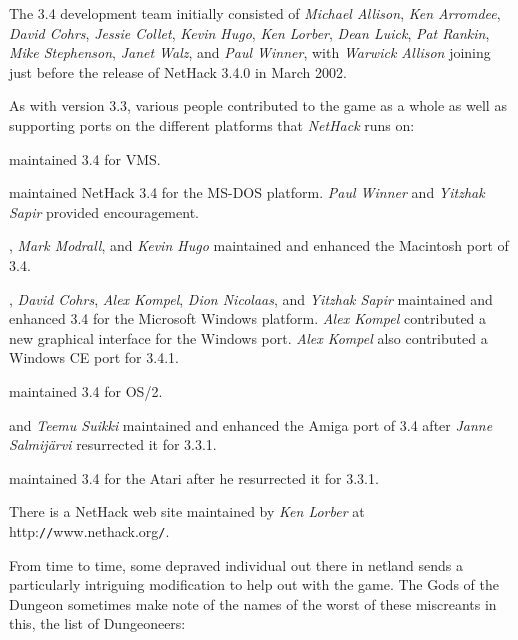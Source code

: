 \medskip
The 3.4 development team initially consisted of 
{\it Michael Allison}, {\it Ken Arromdee},
{\it David Cohrs}, {\it Jessie Collet}, {\it Kevin Hugo}, {\it Ken Lorber},
{\it Dean Luick}, {\it Pat Rankin}, {\it Mike Stephenson}, 
{\it Janet Walz}, and {\it Paul Winner}, with {\it  Warwick Allison} joining 
just before the release of NetHack 3.4.0 in March 2002.

\medskip
As with version 3.3, various people contributed to the game as a whole as
well as supporting ports on the different platforms that {\it NetHack\/}
runs on:

\medskip
{} maintained 3.4 for VMS.

\medskip
{} maintained NetHack 3.4 for the MS-DOS platform.
{\it Paul Winner} and {\it Yitzhak Sapir} provided encouragement.

\medskip
{}, {\it Mark Modrall}, and {\it Kevin Hugo} maintained and
enhanced the Macintosh port of 3.4.

\medskip
{}, {\it David Cohrs}, {\it Alex Kompel}, {\it Dion Nicolaas}, and 
{\it Yitzhak Sapir} maintained and enhanced 3.4 for the Microsoft Windows platform.
{\it Alex Kompel} contributed a new graphical interface for the Windows port. 
{\it Alex Kompel} also contributed a Windows CE port for 3.4.1.

\medskip
{} maintained 3.4 for OS/2.

\medskip
{} and {\it Teemu Suikki} maintained
and enhanced the Amiga port of 3.4 after {\it Janne Salmij\"{a}rvi} resurrected
it for 3.3.1.

\medskip
{} maintained 3.4 for the Atari after he
resurrected it for 3.3.1.

\medskip
\nd There is a NetHack web site maintained by {\it Ken Lorber} at 
http:{\tt /}{\tt /}www.nethack.org{\tt /}.

\bigskip
\nd From time to time, some depraved individual out there in netland sends a
particularly intriguing modification to help out with the game.  The Gods of
the Dungeon sometimes make note of the names of the worst of these miscreants
in this, the list of Dungeoneers:

